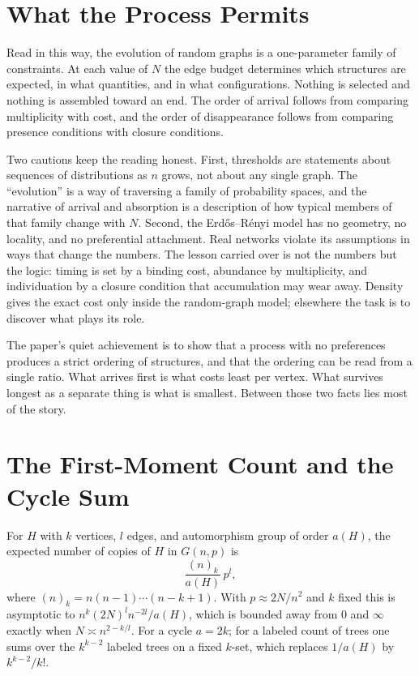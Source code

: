 \documentclass[11pt]{article}
\begin{document}
\section{What the Process Permits}

Read in this way, the evolution of random graphs is a one-parameter family of constraints. At each value of $N$ the edge budget determines which structures are expected, in what quantities, and in what configurations. Nothing is selected and nothing is assembled toward an end. The order of arrival follows from comparing multiplicity with cost, and the order of disappearance follows from comparing presence conditions with closure conditions.

Two cautions keep the reading honest. First, thresholds are statements about sequences of distributions as $n$ grows, not about any single graph. The ``evolution'' is a way of traversing a family of probability spaces, and the narrative of arrival and absorption is a description of how typical members of that family change with $N$. Second, the Erd\H{o}s--R\'enyi model has no geometry, no locality, and no preferential attachment. Real networks violate its assumptions in ways that change the numbers. The lesson carried over is not the numbers but the logic: timing is set by a binding cost, abundance by multiplicity, and individuation by a closure condition that accumulation may wear away. Density gives the exact cost only inside the random-graph model; elsewhere the task is to discover what plays its role.

The paper's quiet achievement is to show that a process with no preferences produces a strict ordering of structures, and that the ordering can be read from a single ratio. What arrives first is what costs least per vertex. What survives longest as a separate thing is what is smallest. Between those two facts lies most of the story.

\appendix
\section{The First-Moment Count and the Cycle Sum}

For $H$ with $k$ vertices, $l$ edges, and automorphism group of order $a(H)$, the expected number of copies of $H$ in $G(n,p)$ is
\[
\frac{(n)_k}{a(H)}\,p^l,
\]
where $(n)_k = n(n-1)\cdots(n-k+1)$. With $p \approx 2N/n^2$ and $k$ fixed this is asymptotic to $n^k (2N)^l n^{-2l}/a(H)$, which is bounded away from $0$ and $\infty$ exactly when $N\asymp n^{2-k/l}$. For a cycle $a = 2k$; for a labeled count of trees one sums over the $k^{k-2}$ labeled trees on a fixed $k$-set, which replaces $1/a(H)$ by $k^{k-2}/k!$.
\end{document}
